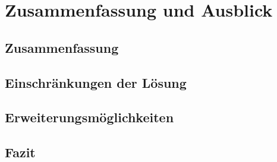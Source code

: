 \chapter{Zusammenfassung und Ausblick}
    \label{chapter:SummaryAndOutlook}

    \section{Zusammenfassung}
    \section{Einschränkungen der Lösung}
    \section{Erweiterungsmöglichkeiten}
    \section{Fazit}